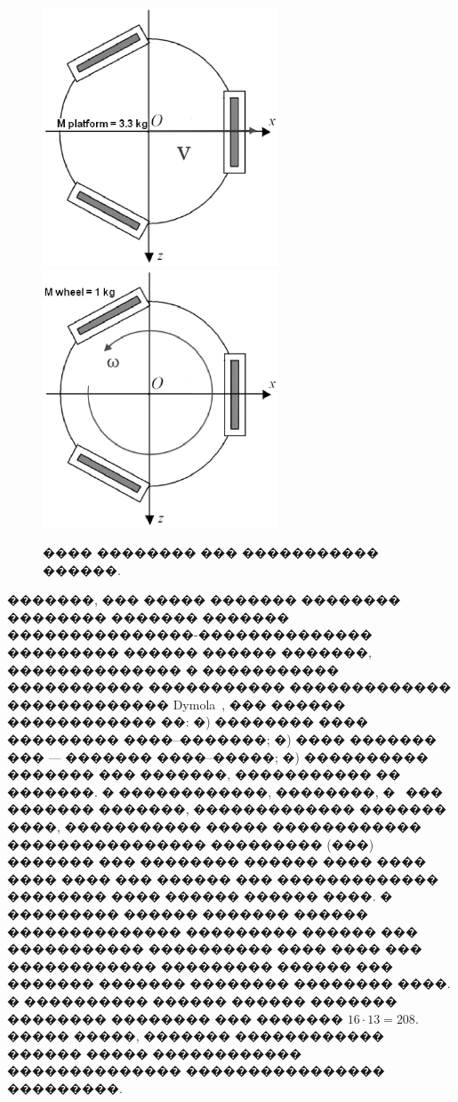 \documentclass[12pt,a4paper]{article}
\begin{document}
\begin{figure}[htb]
\centerline{
\includegraphics[width=7cm]{Translat.eps}
\includegraphics[width=7cm]{Rotat.eps}
}
\caption{���� �������� ��� ����������� ������.}
\label{TypesOfMotion}
\end{figure}

�������, ��� ����� ������� �������� �������� ������� ������� 
���������������-�������������� ��������� ������ ������ �������, ��������������
� ����������� ����������� ����������� ������������� ������������� 
Dymola~\cite{Dymola}, ��� ������ ������������ ��: �) �������� ���� ���������
����--�������; �) ���� ������� ��� --- ������� ����--�����; �) ���������� 
������� ��� �������, ����������� �� �������. � ������������, ��������, 
�~\cite{Kosenko2007} ��� ������� �������, ������������� ������� ����, 
����������� ����� ������������ ���������������� ��������� (���) ������� ���
�������� ������ ���� ���� ���� ���� ��� ������ ��� ������������� �������� ����
������ ������ ����. � ��������� ������ ������� ������ �������������� ���������
������ ��� ����������� ���������� ���� ���� ��� ������������ ��������� ������
��� ������� ������� �������� �������� ����. � ���������� ������ ������ �������
�������� �������� ��� ������� $16\cdot 13=208$. ����� �����, ������� 
������������ ������ ����� ������������ �������������� ���������������� 
���������.
\end{document}
